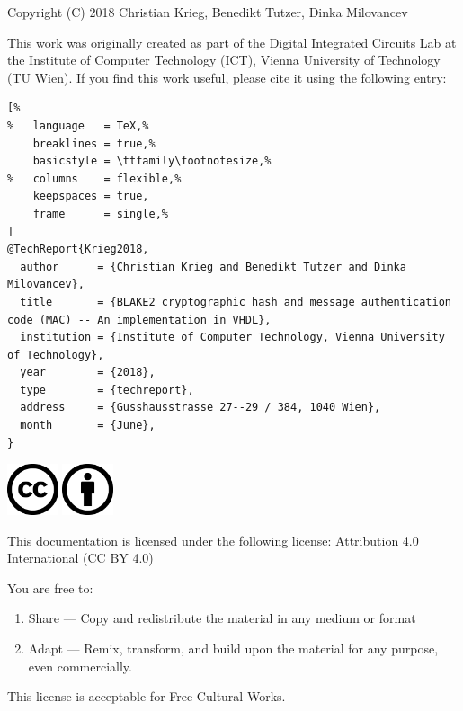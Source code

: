 \documentclass[%
	a4paper,
]
{article}
\begin{document}
Copyright (C) 2018 Christian Krieg, Benedikt Tutzer, Dinka Milovancev

This work was originally created as part of the Digital Integrated Circuits
Lab at the Institute of Computer Technology (ICT), Vienna University of
Technology (TU Wien). If you find this work useful, please cite it using
the following \BibTeX{ } entry:

\vspace{1em}

\begin{lstlisting}[%
%	language   = TeX,%
	breaklines = true,%
	basicstyle = \ttfamily\footnotesize,%
%	columns    = flexible,%
	keepspaces = true,
	frame      = single,%
]
@TechReport{Krieg2018,
  author      = {Christian Krieg and Benedikt Tutzer and Dinka Milovancev},
  title       = {BLAKE2 cryptographic hash and message authentication code (MAC) -- An implementation in VHDL},
  institution = {Institute of Computer Technology, Vienna University of Technology},
  year        = {2018},
  type        = {techreport},
  address     = {Gusshausstrasse 27--29 / 384, 1040 Wien},
  month       = {June},
}
\end{lstlisting}

\vfill

\includegraphics[height=1.5cm]{fig/cc-large.png}
\includegraphics[height=1.5cm]{fig/by-large.png}


This documentation is licensed under the following license:
Attribution 4.0 International (CC BY 4.0)

\vspace{3em}

You are free to:

\begin{enumerate}
    \item Share --- Copy and redistribute the material in any medium or format
    \item Adapt --- Remix, transform, and build upon the material for any purpose,
			even commercially.
\end{enumerate}

This license is acceptable for Free Cultural Works.
\end{document}
